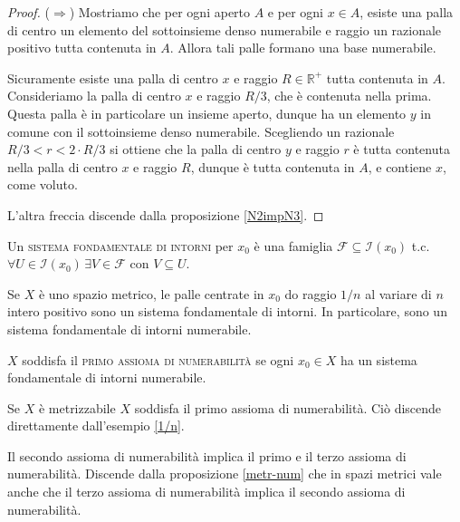 \documentclass{article}
\begin{document}
\begin{proof}
	($\Rightarrow$) Mostriamo che per ogni aperto $A$ e per ogni $x \in A$,
	esiste una palla di centro un elemento del sottoinsieme denso numerabile e
	raggio un razionale positivo tutta contenuta in $A$. Allora tali palle
	formano una base numerabile.

	Sicuramente esiste una palla di centro $x$ e raggio $R \in \mathbb{R}^+$
	tutta contenuta in $A$. Consideriamo la palla di centro $x$ e raggio $R/3$,
	che è contenuta nella prima. Questa palla è in particolare un insieme
	aperto, dunque ha un elemento $y$ in comune con il sottoinsieme denso
	numerabile. Scegliendo un razionale $R/3<r<2 \cdot R/3$ si ottiene che la
	palla di centro $y$ e raggio $r$ è tutta contenuta nella palla di centro $x$
	e raggio $R$, dunque è tutta contenuta in $A$, e contiene $x$, come voluto.

	L'altra freccia discende dalla proposizione \ref{N2impN3}.
\end{proof}

\begin{defn}
	Un \textsc{sistema fondamentale di intorni} per $x_0$ è una famiglia
	$\mathcal{F} \subseteq \mathcal{I}(x_0)$ t.c. $\forall U \in
	\mathcal{I}(x_0) \, \exists V \in \mathcal{F}$ con $V \subseteq U$.
\end{defn}

\begin{ex} \label{1/n}
	Se $X$ è uno spazio metrico, le palle centrate in $x_0$ do raggio $1/n$ al
	variare di $n$ intero positivo sono un sistema fondamentale di intorni. In
	particolare, sono un sistema fondamentale di intorni numerabile.
\end{ex}

\begin{defn} \label{N1}
	$X$ soddisfa il \textsc{primo assioma di numerabilità} se ogni $x_0 \in X$
	ha un sistema fondamentale di intorni numerabile.
\end{defn}

\begin{ftt}
	Se $X$ è metrizzabile $X$ soddisfa il primo assioma di numerabilità. Ciò
	discende direttamente dall'esempio \ref{1/n}.
\end{ftt}

\begin{prop} \label{N2power}
	Il secondo assioma di numerabilità implica il primo e il terzo assioma di
	numerabilità. Discende dalla proposizione \ref{metr-num} che in spazi
	metrici vale anche che il terzo assioma di numerabilità implica il secondo
	assioma di numerabilità.
\end{prop}
\end{document}
